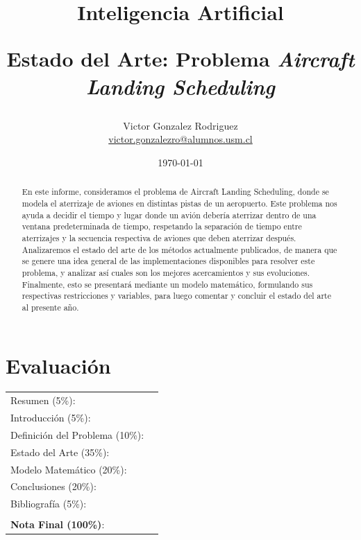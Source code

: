 \documentclass[letter, 11pt]{article}
\begin{document}
\title{Inteligencia Artificial \\ \begin{Large}Estado del Arte: Problema \textit{Aircraft Landing Scheduling}\end{Large}}
\author{Victor Gonzalez Rodriguez\\ \url{victor.gonzalezro@alumnos.usm.cl}}
\date{\today}
\maketitle


\section*{Evaluación}

\begin{tabular}{ll}
Resumen (5\%): & \underline{\hspace{2cm}} \\
Introducci\'on (5\%):  & \underline{\hspace{2cm}} \\
Definici\'on del Problema (10\%):  & \underline{\hspace{2cm}} \\
Estado del Arte (35\%):  & \underline{\hspace{2cm}} \\
Modelo Matem\'atico (20\%): &  \underline{\hspace{2cm}}\\
Conclusiones (20\%): &  \underline{\hspace{2cm}}\\
Bibliograf\'ia (5\%): & \underline{\hspace{2cm}}\\
 &  \\
\textbf{Nota Final (100\%)}:   & \underline{\hspace{2cm}}
\end{tabular}
\vspace{2cm}


\begin{abstract}
En este informe, consideramos el problema de Aircraft Landing Scheduling, donde se modela el aterrizaje de aviones en distintas pistas de un aeropuerto. Este problema nos ayuda a decidir el tiempo y lugar donde un avión debería aterrizar dentro de una ventana predeterminada de tiempo, respetando la separación de tiempo entre aterrizajes y la secuencia respectiva de aviones que deben aterrizar después. Analizaremos el estado del arte de los métodos actualmente publicados, de manera que se genere una idea general de las implementaciones disponibles para resolver este problema, y analizar así cuales son los mejores acercamientos y sus evoluciones. Finalmente, esto se presentará mediante un modelo matemático, formulando sus respectivas restricciones y variables, para luego comentar y concluir el estado del arte al presente año.
\end{abstract}
\end{document}
